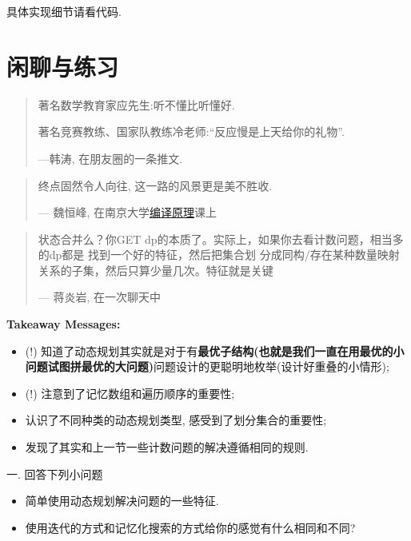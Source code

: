 具体实现细节请看代码. 

\section*{闲聊与练习}

\begin{quote}
    著名数学教育家应先生:听不懂比听懂好.

    著名竞赛教练、国家队教练冷老师:``反应慢是上天给你的礼物''.

    \hfill ---韩涛, 在朋友圈的一条推文.  
\end{quote}

\begin{quote}
    终点固然令人向往, 这一路的风景更是美不胜收. 

    \hfill --- 魏恒峰, 在南京大学\href{https://www.bilibili.com/video/BV1K24y1u7eA}{编译原理}课上
\end{quote}

\begin{quote}
    状态合并么？你GET dp的本质了。实际上，如果你去看计数问题，相当多的dp都是
    找到一个好的特征，然后把集合划
    分成同构/存在某种数量映射关系的子集，然后只算少量几次。特征就是关键

    \hfill --- 蒋炎岩, 在一次聊天中
\end{quote}

\textbf{Takeaway Messages: }
\begin{itemize}
    \item (!) 知道了动态规划其实就是对于有\textbf{最优子结构(也就是我们一直在用最优的小问题试图拼最优的大问题)}问题设计的更聪明地枚举(设计好重叠的小情形);
    \item (!) 注意到了记忆数组和遍历顺序的重要性;
    \item 认识了不同种类的动态规划类型, 感受到了划分集合的重要性;
    \item 发现了其实和上一节一些计数问题的解决遵循相同的规则.
\end{itemize}


一. 回答下列小问题
\begin{itemize}[noitemsep]
    \item 简单使用动态规划解决问题的一些特征. 
    \item 使用迭代的方式和记忆化搜索的方式给你的感觉有什么相同和不同?
\end{itemize}